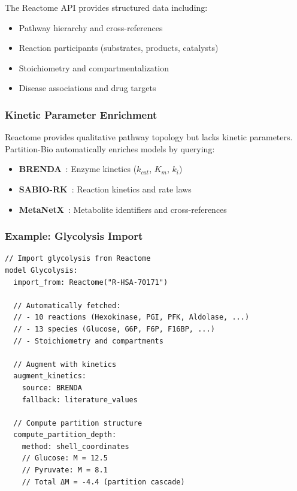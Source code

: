 \documentclass[12pt,a4paper]{article}
\begin{document}
The Reactome API provides structured data including:
\begin{itemize}
    \item Pathway hierarchy and cross-references
    \item Reaction participants (substrates, products, catalysts)
    \item Stoichiometry and compartmentalization
    \item Disease associations and drug targets
\end{itemize}

\subsubsection{Kinetic Parameter Enrichment}

Reactome provides qualitative pathway topology but lacks kinetic parameters. Partition-Bio automatically enriches models by querying:

\begin{itemize}
    \item \textbf{BRENDA}~\cite{schomburg2004brenda}: Enzyme kinetics ($k_{cat}$, $K_m$, $k_i$)
    \item \textbf{SABIO-RK}~\cite{wittig2012sabio}: Reaction kinetics and rate laws
    \item \textbf{MetaNetX}~\cite{moretti2016metanetx}: Metabolite identifiers and cross-references
\end{itemize}

\subsubsection{Example: Glycolysis Import}

\begin{lstlisting}[basicstyle=\ttfamily\small]
// Import glycolysis from Reactome
model Glycolysis:
  import_from: Reactome("R-HSA-70171")
  
  // Automatically fetched:
  // - 10 reactions (Hexokinase, PGI, PFK, Aldolase, ...)
  // - 13 species (Glucose, G6P, F6P, F16BP, ...)
  // - Stoichiometry and compartments
  
  // Augment with kinetics
  augment_kinetics:
    source: BRENDA
    fallback: literature_values
    
  // Compute partition structure
  compute_partition_depth:
    method: shell_coordinates
    // Glucose: M = 12.5
    // Pyruvate: M = 8.1
    // Total ΔM = -4.4 (partition cascade)
\end{lstlisting}
\end{document}
